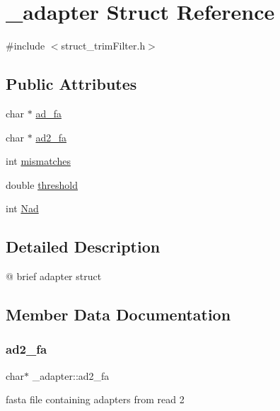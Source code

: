 \hypertarget{struct__adapter}{}\section{\+\_\+adapter Struct Reference}
\label{struct__adapter}


{\ttfamily \#include $<$struct\+\_\+trim\+Filter.\+h$>$}

\subsection*{Public Attributes}
\begin{DoxyCompactItemize}
\item 
char $\ast$ \mbox{\hyperlink{struct__adapter_ad05cb8ebdfbb0728b8069ed17c7d264c}{ad\+\_\+fa}}
\item 
char $\ast$ \mbox{\hyperlink{struct__adapter_a3e3ff61737be3da0dcab7911ca6ca7c3}{ad2\+\_\+fa}}
\item 
int \mbox{\hyperlink{struct__adapter_a51c6998b13837c66f79b3a1dd3c11995}{mismatches}}
\item 
double \mbox{\hyperlink{struct__adapter_a2d1273cfaa0d51c79f331b92ed2342b4}{threshold}}
\item 
int \mbox{\hyperlink{struct__adapter_aed006c3b66849e781049076b11f297d3}{Nad}}
\end{DoxyCompactItemize}


\subsection{Detailed Description}
@ brief adapter struct 

\subsection{Member Data Documentation}
\mbox{\label{struct__adapter_a3e3ff61737be3da0dcab7911ca6ca7c3}} 
\subsubsection{\texorpdfstring{ad2\+\_\+fa}{ad2\_fa}}
{\footnotesize\ttfamily char$\ast$ \+\_\+adapter\+::ad2\+\_\+fa}

fasta file containing adapters from read 2 \mbox{\label{struct__adapter_ad05cb8ebdfbb0728b8069ed17c7d264c}} 
